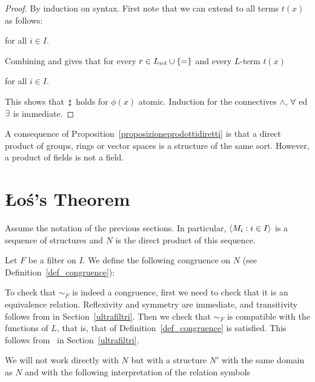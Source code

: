 \documentclass[creche.tex]{subfiles}
\begin{document}
\begin{proof}
By induction on syntax. First note that we can extend  to all terms $t(x)$ as follows:

\hfill  for all $i\in I$. 

Combining  and  gives that for every $r\in L_{\rm rel}\cup\{=\}$ and every $L$-term $t(x)$

\hfill  for all $i\in I$.

This shows that $\,\sharp\,$ holds for $\phi(x)$ atomic. Induction for the connectives $\wedge$, $\forall$ ed $\exists$ is immediate.
\end{proof}

A consequence of Proposition~\ref{proposizioneprodottidiretti} is that a direct product of groups, rings or vector spaces is a structure of the same sort. However, a product of fields is not a field.

\section{\L o\'{s}'s Theorem}
Assume the notation of the previous sections.
In particular, $\langle M_i:i\in I\rangle$ is a sequence of structures and $N$ is the direct product of this sequence. 

Let $F$ be a filter on $I$. We define the following congruence on $N$ (see Definition~\ref{def_congruence}):


To check that $\sim_F$ is indeed a congruence, first we need to check that it is an equivalence relation. Reflexivity and symmetry are immediate, and transitivity follows from  in Section~\ref{ultrafiltri}. Then we check that $\sim_F$ is compatible with the functions of $L$, that is, that  of Definition~\ref{def_congruence} is satisfied. This follows from~ in Section~\ref{ultrafiltri}.

We will not work directly with $N$ but with a structure $N'$ with the same domain as $N$ and with the following interpretation of the relation symbols
\end{document}
